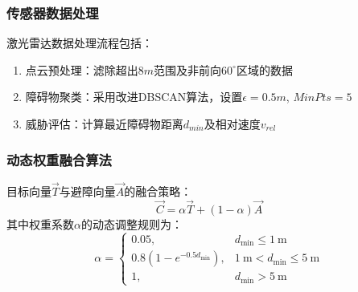 \subsubsection{传感器数据处理}
激光雷达数据处理流程包括：
\begin{enumerate}
	\item 点云预处理：滤除超出$8m$范围及非前向$60^\circ$区域的数据
	\item 障碍物聚类：采用改进DBSCAN算法，设置$\epsilon=0.5m$, $MinPts=5$
	\item 威胁评估：计算最近障碍物距离$d_{min}$及相对速度$v_{rel}$
\end{enumerate}

\subsubsection{动态权重融合算法}
目标向量$\vec{T}$与避障向量$\vec{A}$的融合策略：
\begin{equation}
	\vec{C} = \alpha \vec{T} + (1-\alpha)\vec{A}
\end{equation}
其中权重系数$\alpha$的动态调整规则为：
\begin{equation}
    \alpha = 
    \begin{cases}
        0.05, & d_{\text{min}} \leq 1\ \text{m} \\
        0.8(1 - e^{-0.5d_{\text{min}}}), & 1\ \text{m} < d_{\text{min}} \leq 5\ \text{m} \\
        1, & d_{\text{min}} > 5\ \text{m}
    \end{cases}
\end{equation}

